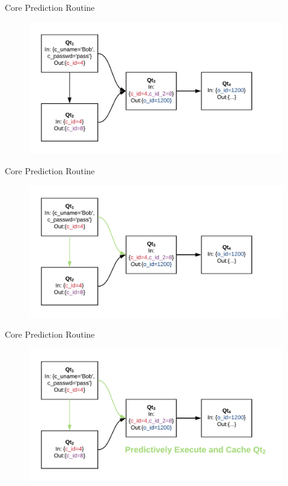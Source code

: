 \documentclass[10pt]{beamer}
\begin{document}
\begin{frame}[fragile]{Core Prediction Routine}
    \begin{figure}
        \hspace*{-1cm}
        \includegraphics[scale=0.22]{apollo_cpr}
    \end{figure}
\end{frame}

\begin{frame}[fragile]{Core Prediction Routine}
    \begin{figure}
        \hspace*{-1cm}
        \includegraphics[scale=0.22]{apollo_cpr_2}
    \end{figure}
\end{frame}

\begin{frame}[fragile]{Core Prediction Routine}
    \begin{figure}
        \hspace*{-1cm}
        \includegraphics[scale=0.22]{apollo_cpr_3}
    \end{figure}
\end{frame}
\end{document}
